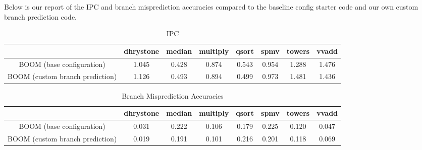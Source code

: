 \documentclass[11pt]{article}
\begin{document}
Below is our report of the IPC and branch misprediction accuracies compared to the baseline config starter code and our own custom branch prediction code.

\begin{table}[ht]
	\caption{IPC} %
	\centering %
	\begin{tabular}{c c c c c c c c} %
		\hline\hline %
		                                & dhrystone & median & multiply & qsort & spmv  & towers & vvadd \\ [0.5ex] %
		\hline %
		BOOM (base configuration)       & 1.045     & 0.428  & 0.874    & 0.543 & 0.954 & 1.288  & 1.476 \\
		BOOM (custom branch prediction) & 1.126     & 0.493  & 0.894    & 0.499 & 0.973 & 1.481  & 1.436 \\
		[1ex] %
		\hline %
	\end{tabular}
	\label{table:nonlin} %
\end{table}

\begin{table}[ht]
	\caption{Branch Misprediction Accuracies} %
	\centering %
	\begin{tabular}{c c c c c c c c} %
		\hline\hline %
		                                & dhrystone & median & multiply & qsort & spmv  & towers & vvadd \\ [0.5ex] %
		\hline %
		BOOM (base configuration)       & 0.031     & 0.222  & 0.106    & 0.179 & 0.225 & 0.120  & 0.047 \\
		BOOM (custom branch prediction) & 0.019     & 0.191  & 0.101    & 0.216 & 0.201 & 0.118  & 0.069 \\
		[1ex] %
		\hline %
	\end{tabular}
	\label{table:nonlin} %
\end{table}
\newpage

\end{document}
